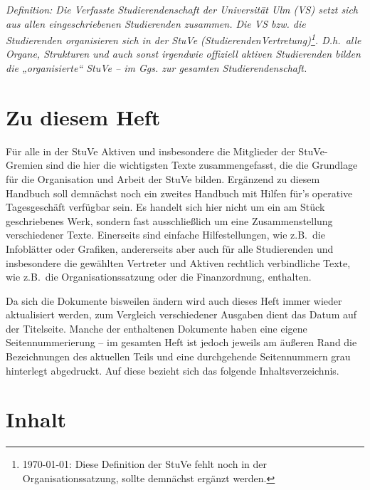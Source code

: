 

\textit{Definition: Die Verfasste Studierendenschaft der Universität Ulm (VS) setzt sich aus allen eingeschriebenen Studierenden zusammen.
Die VS bzw. die Studierenden organisieren sich in der StuVe (StudierendenVertretung)\footnote{\today: Diese Definition der StuVe fehlt noch in der Organisationssatzung, sollte demnächst ergänzt werden.}.
D.h.\ alle Organe, Strukturen und auch sonst irgendwie offiziell aktiven Studierenden bilden die „organisierte“ StuVe – im Ggs. zur gesamten Studierendenschaft.}


\section*{Zu diesem Heft}


Für alle in der StuVe Aktiven und insbesondere die Mitglieder der StuVe-Gremien sind die hier die wichtigsten Texte zusammengefasst, die die Grundlage für die Organisation und Arbeit der StuVe bilden. Ergänzend zu diesem Handbuch soll demnächst noch ein zweites Handbuch mit Hilfen für's operative Tagesgeschäft verfügbar sein.
Es handelt sich hier nicht um ein am Stück geschriebenes Werk, sondern fast ausschließlich um eine Zusammenstellung verschiedener Texte.
Einerseits sind einfache Hilfestellungen, wie z.B.\ die Infoblätter oder Grafiken, andererseits aber auch für alle Studierenden und insbesondere die gewählten Vertreter und Aktiven rechtlich verbindliche Texte, wie z.B.\ die Organisationssatzung oder die Finanzordnung, enthalten.

Da sich die Dokumente bisweilen ändern wird auch dieses Heft immer wieder aktualisiert werden, zum Vergleich verschiedener Ausgaben dient das Datum auf der Titelseite.
Manche der enthaltenen Dokumente haben eine eigene Seitennummerierung – im gesamten Heft ist jedoch jeweils am äußeren Rand die Bezeichnungen des aktuellen Teils und eine durchgehende Seitennummern grau hinterlegt abgedruckt. Auf diese bezieht sich das folgende Inhaltsverzeichnis.


\section*{Inhalt}

